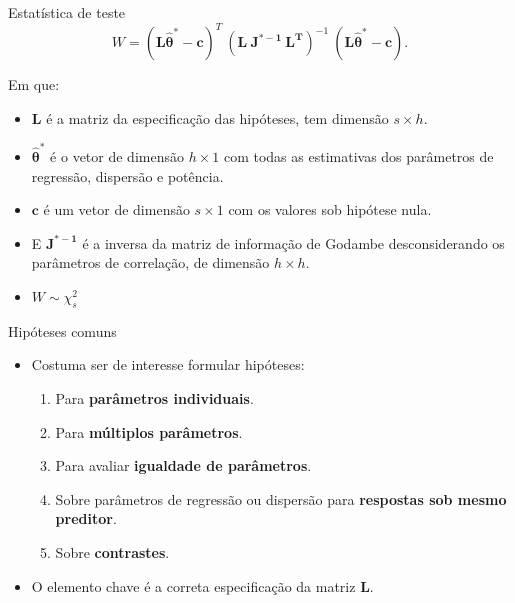 \documentclass[
  ignorenonframetext,
  serif,
  professionalfont,
  usenames,
  dvipsnames,
  aspectratio = 169]{beamer}
\begin{document}
\begin{frame}{Estatística de teste}
\protect\hypertarget{estatuxedstica-de-teste}{}
\[W = (\boldsymbol{L\hat\theta^{*}} - \boldsymbol{c})^T \ (\boldsymbol{L \ J^{\boldsymbol{*}-1} \ L^T})^{-1} \ (\boldsymbol{L\hat\theta^{*}} - \boldsymbol{c}).\]

Em que:

\begin{itemize}
  \item $\boldsymbol{L}$ é a matriz da especificação das hipóteses, tem dimensão $s \times h$. 

  \item $\boldsymbol{\hat\theta^{*}}$ é o vetor de dimensão $h \times 1$ com todas as estimativas dos parâmetros de regressão, dispersão e potência. 

  \item $\boldsymbol{c}$ é um vetor de dimensão $s \times 1$ com os valores sob hipótese nula. 

  \item E $\boldsymbol{J^{\boldsymbol{*}-1}}$ é a inversa da matriz de informação de Godambe desconsiderando os parâmetros de correlação, de dimensão $h \times h$. 
  
  \item $W \sim \chi^2_s$

\end{itemize}
\end{frame}

\begin{frame}{Hipóteses comuns}
\protect\hypertarget{hipuxf3teses-comuns}{}
\begin{itemize}
  \itemsep 2ex
  
  \item Costuma ser de interesse formular hipóteses:
    \begin{enumerate}
      \itemsep 1ex
      \item Para \textbf{parâmetros individuais}.
      \item Para \textbf{múltiplos parâmetros}.
      \item Para avaliar \textbf{igualdade de parâmetros}.
      \item Sobre parâmetros de regressão ou dispersão para \textbf{respostas sob mesmo preditor}.
      \item Sobre \textbf{contrastes}.
\end{enumerate}
  
  \item O elemento chave é a correta especificação da matriz $\boldsymbol{L}$.
  
\end{itemize}
\end{frame}
\end{document}
